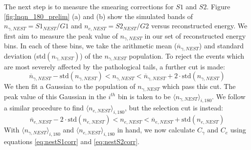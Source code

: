The next step is to measure the smearing corrections for $S1$ and $S2$. Figure \ref{fig:lnqn_180_prelim} (a) and (b) show the simulated bands of $n_{\gamma,NEST}=S1_{NEST}/G1$ and $n_{e,NEST}=S2_{NEST}/G2$ versus reconstructed energy. We first aim to measure the peak value of $n_{\gamma,NEST}$ in our set of reconstructed energy bins. In each of these bins, we take the arithmetic mean ($\overline{n}_{\gamma,NEST}$) and standard deviation (std$(n_{\gamma,NEST})$) of the $n_{\gamma,NEST}$ population. To reject the events which are most severely affected by the pathological tails, a further cut is made:
\begin{equation}
\overline{n}_{\gamma,NEST}-\text{std}(n_{\gamma,NEST})<n_{\gamma,NEST}<\overline{n}_{\gamma,NEST}+2\cdot \text{std}(n_{\gamma,NEST})
\end{equation}
We then fit a Gaussian to the population of $n_{\gamma,NEST}$ which pass this cut. The peak value of this Gaussian in the $i^{th}$ bin is taken to be $\langle n_{\gamma,NEST} \rangle_{i,180}$. We follow a similar procedure to find $\langle n_{e,NEST} \rangle_{i,180}$, but the selection cut is instead:
\begin{equation}
\overline{n}_{e,NEST}-2\cdot \text{std}(n_{e,NEST})<n_{e,NEST}<\overline{n}_{e,NEST}+ \text{std}(n_{e,NEST})
\end{equation}
With $\langle n_{\gamma,NEST} \rangle_{i,180}$ and $\langle n_{e,NEST} \rangle_{i,180}$ in hand, we now calculate $C_{\gamma}$ and $C_e$ using equations \ref{eq:nestS1corr} and \ref{eq:nestS2corr}.
